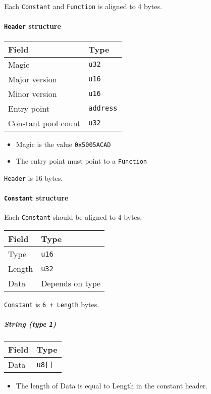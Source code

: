 Each \texttt{Constant} and \texttt{Function} is aligned to 4 bytes.

\paragraph{\texorpdfstring{\texttt{Header} structure}{Header structure}}

\begin{tabular}{ll}
\toprule
Field & Type\tabularnewline
\midrule
Magic & \texttt{u32}\tabularnewline
Major version & \texttt{u16}\tabularnewline
Minor version & \texttt{u16}\tabularnewline
Entry point & \texttt{address}\tabularnewline
Constant pool count & \texttt{u32}\tabularnewline
\bottomrule
\end{tabular}

\begin{itemize}
\item
  Magic is the value \texttt{0x5005ACAD}
\item
  The entry point must point to a \texttt{Function}
\end{itemize}

\texttt{Header} is 16 bytes.

\paragraph{\texorpdfstring{\texttt{Constant}
structure}{Constant structure}}

Each \texttt{Constant} should be aligned to 4 bytes.

\medskip

\begin{tabular}{ll}
\toprule
Field & Type\tabularnewline
\midrule
Type & \texttt{u16}\tabularnewline
Length & \texttt{u32}\tabularnewline
Data & Depends on type\tabularnewline
\bottomrule
\end{tabular}

\medskip

\texttt{Constant} is \texttt{6\ +\ Length} bytes.

\subparagraph{\texorpdfstring{String (type
\texttt{1})}{String (type 1)}}

\begin{tabular}{ll}
\toprule
Field & Type\tabularnewline
\midrule
Data & \texttt{u8{[}{]}}\tabularnewline
\bottomrule
\end{tabular}

\begin{itemize}
\item
  The length of Data is equal to Length in the constant header.
\end{itemize}

